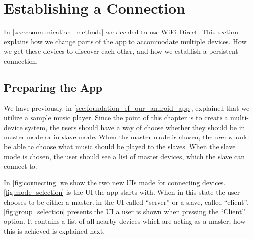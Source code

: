 \section{Establishing a Connection}\label{sec:establishing_a_connection}
In \cref{sec:communication_methods} we decided to use WiFi Direct.
This section explains how we change parts of the app to accommodate multiple devices.
How we get these devices to discover each other, and how we establish a persistent connection.

\subsection{Preparing the App}
We have previously, in \cref{sec:foundation_of_our_android_app}, explained that we utilize a sample music player.
Since the point of this chapter is to create a multi-device system, the users should have a way of choose whether they should be in master mode or in slave mode.
When the master mode is chosen, the user should be able to choose what music should be played to the slaves.
When the slave mode is chosen, the user should see a list of master devices, which the slave can connect to.

In \cref{fig:connecting} we show the two new UIs made for connecting devices.
\cref{fig:mode_selection} is the UI the app starts with.
When in this state the user chooses to be either a master, in the UI called ``server'' or a slave, called ``client''.
\cref{fig:group_selection} presents the UI a user is shown when pressing the ``Client'' option.
It contains a list of all nearby devices which are acting as a master, how this is achieved is explained next.

